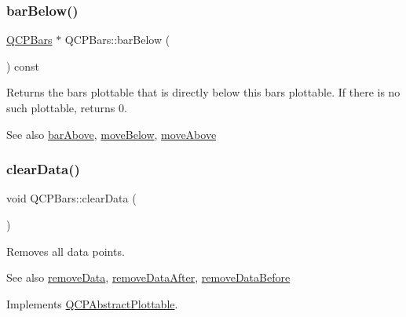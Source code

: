 \subsubsection{\texorpdfstring{bar\+Below()}{barBelow()}}
{\footnotesize\ttfamily \mbox{\hyperlink{class_q_c_p_bars}{Q\+C\+P\+Bars}} $\ast$ Q\+C\+P\+Bars\+::bar\+Below (\begin{DoxyParamCaption}{ }\end{DoxyParamCaption}) const\hspace{0.3cm}{\ttfamily [inline]}}

Returns the bars plottable that is directly below this bars plottable. If there is no such plottable, returns 0.

\begin{DoxySeeAlso}{See also}
\mbox{\hyperlink{class_q_c_p_bars_ab97f2acd9f6cb40d2cc3c33d278f0e78}{bar\+Above}}, \mbox{\hyperlink{class_q_c_p_bars_a69fc371346980f19177c3d1ecdad78ee}{move\+Below}}, \mbox{\hyperlink{class_q_c_p_bars_ac22e00a6a41509538c21b04f0a57318c}{move\+Above}} 
\end{DoxySeeAlso}
\mbox{\label{class_q_c_p_bars_a11dbbd707132f07f862dff13c5789c2b}} 
\subsubsection{\texorpdfstring{clear\+Data()}{clearData()}}
{\footnotesize\ttfamily void Q\+C\+P\+Bars\+::clear\+Data (\begin{DoxyParamCaption}{ }\end{DoxyParamCaption})\hspace{0.3cm}{\ttfamily [virtual]}}

Removes all data points. \begin{DoxySeeAlso}{See also}
\mbox{\hyperlink{class_q_c_p_bars_a1fe9bcb57d670defea1bb65cadf43765}{remove\+Data}}, \mbox{\hyperlink{class_q_c_p_bars_a99de6e7abbbf03fb41fa604c7f08aa8b}{remove\+Data\+After}}, \mbox{\hyperlink{class_q_c_p_bars_a9d12779a3fad4820aad2c428f368298d}{remove\+Data\+Before}} 
\end{DoxySeeAlso}


Implements \mbox{\hyperlink{class_q_c_p_abstract_plottable_a86e5b8fd4b6ff4f4084e7ea4c573fc53}{Q\+C\+P\+Abstract\+Plottable}}.

\mbox{\label{class_q_c_p_bars_ac22e00a6a41509538c21b04f0a57318c}} 
